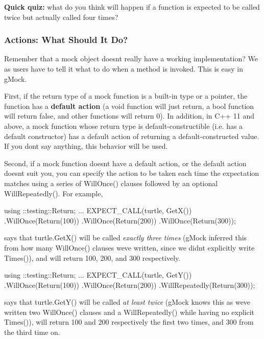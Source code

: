 {\bfseries Quick quiz\+:} what do you think will happen if a function is expected to be called twice but actually called four times?

\subsubsection*{Actions\+: What Should It Do?}

Remember that a mock object doesn\textquotesingle{}t really have a working implementation? We as users have to tell it what to do when a method is invoked. This is easy in g\+Mock.

First, if the return type of a mock function is a built-\/in type or a pointer, the function has a {\bfseries default action} (a {\ttfamily void} function will just return, a {\ttfamily bool} function will return {\ttfamily false}, and other functions will return 0). In addition, in C++ 11 and above, a mock function whose return type is default-\/constructible (i.\+e. has a default constructor) has a default action of returning a default-\/constructed value. If you don\textquotesingle{}t say anything, this behavior will be used.

Second, if a mock function doesn\textquotesingle{}t have a default action, or the default action doesn\textquotesingle{}t suit you, you can specify the action to be taken each time the expectation matches using a series of {\ttfamily Will\+Once()} clauses followed by an optional {\ttfamily Will\+Repeatedly()}. For example,


\begin{DoxyCode}
using ::testing::Return;
...
EXPECT\_CALL(turtle, GetX())
     .WillOnce(Return(100))
     .WillOnce(Return(200))
     .WillOnce(Return(300));
\end{DoxyCode}


says that {\ttfamily turtle.\+Get\+X()} will be called {\itshape exactly three times} (g\+Mock inferred this from how many {\ttfamily Will\+Once()} clauses we\textquotesingle{}ve written, since we didn\textquotesingle{}t explicitly write {\ttfamily Times()}), and will return 100, 200, and 300 respectively.


\begin{DoxyCode}
using ::testing::Return;
...
EXPECT\_CALL(turtle, GetY())
     .WillOnce(Return(100))
     .WillOnce(Return(200))
     .WillRepeatedly(Return(300));
\end{DoxyCode}


says that {\ttfamily turtle.\+Get\+Y()} will be called {\itshape at least twice} (g\+Mock knows this as we\textquotesingle{}ve written two {\ttfamily Will\+Once()} clauses and a {\ttfamily Will\+Repeatedly()} while having no explicit {\ttfamily Times()}), will return 100 and 200 respectively the first two times, and 300 from the third time on.

